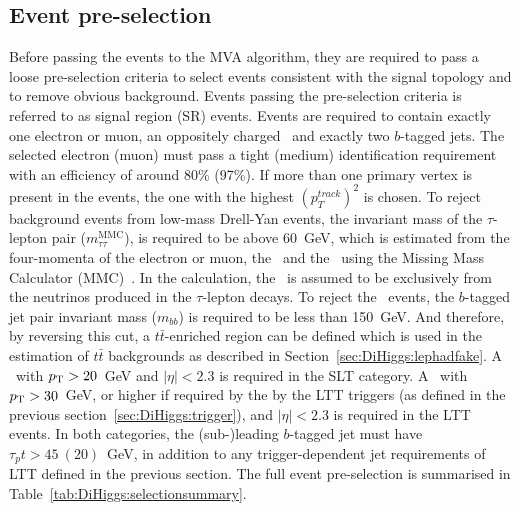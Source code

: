 \subsection{Event pre-selection}

\label{sec:DiHiggs:selection}



Before passing the events to the MVA algorithm, 
they are required to pass a loose pre-selection criteria to 
select events consistent with the signal topology and to
remove obvious background.  
Events passing the pre-selection criteria is referred to as
signal region (SR) events. 
Events are required to contain exactly 
one electron or muon, 
an oppositely charged \tauhad\, 
and exactly two $b$-tagged jets.
The selected electron (muon) must pass a 
tight (medium) identification requirement with an efficiency of around 80\% (97\%).
If more than one primary vertex is present in the events, 
the one with the highest $(p_T^{track})^2$ is chosen.
To reject background events from low-mass Drell-Yan events, 
the invariant mass of the $\tau$-lepton pair ($m_{\tau\tau}^\text{MMC}$),
is required to be above 60~GeV,
which is estimated from the four-momenta of the electron or muon, 
the \tauhad\ and the \met\ using the Missing Mass Calculator (MMC)~\cite{Elagin:2010aw}.
In the calculation, the \met\ is assumed to be exclusively from the neutrinos 
produced in the $\tau$-lepton decays. 
To reject the \ttbar\ events, the $b$-tagged jet pair invariant mass ($m_{bb}$) 
is required to be less than 150~GeV. And therefore, by reversing this cut, 
a $t\bar t$-enriched region can be defined  
which is used in the estimation of $t\bar t$ backgrounds
as described in Section~\ref{sec:DiHiggs:lephadfake}. 
A \tauhad\ with $p_{\mathrm T}>20$~GeV and 
$\vert\eta\vert<2.3$ is required in the SLT category.
A \tauhad\ with $p_{\mathrm T}>30$~GeV,
or higher if required by the by the LTT triggers (as defined in the previous
section~\ref{sec:DiHiggs:trigger}), 
and $\vert\eta\vert<2.3$ is required in the LTT events. 
In both categories, the (sub-)leading $b$-tagged jet 
must have $\tau_pt>45~(20)$~GeV, 
in addition to any trigger-dependent jet requirements of LTT
defined in the previous section.
The full event pre-selection is summarised in Table~\ref{tab:DiHiggs:selectionsummary}. 

